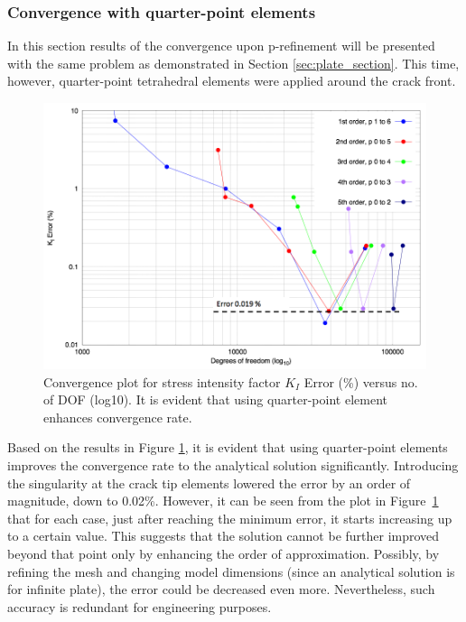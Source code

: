 \documentclass[11pt]{ACMEarticle}
\numberwithin{equation}{section}
\begin{document}
\subsubsection{Convergence with quarter-point elements}
In this section results of the convergence upon p-refinement will be presented with the same problem as demonstrated in Section \ref{sec:plate_section}. This time, however, quarter-point tetrahedral elements were applied around the crack front.
\begin{figure}[h!]
	\centering
	\includegraphics[width=0.7\linewidth]{Figures/graphs/plate_conv_singularity}
	\caption{Convergence plot for stress intensity factor $K_I$ Error (\%) versus no. of DOF (log10). It is evident that using quarter-point element enhances convergence rate.}
	\label{fig:plate_conv_singularity}
\end{figure}
Based on the results in Figure \ref{fig:plate_conv_singularity}, it is evident that using quarter-point elements improves the convergence rate to the analytical solution significantly. Introducing the singularity at the crack tip elements lowered the error by an order of magnitude, down to 0.02\%. However, it can be seen from the plot in Figure~\ref{fig:plate_conv_singularity} that for each case, just after reaching the minimum error, it starts increasing up to a certain value. This suggests that the solution cannot be further improved beyond that point only by enhancing the order of approximation. Possibly, by refining the mesh and changing model dimensions (since an analytical solution is for infinite plate), the error could be decreased even more. Nevertheless, such accuracy is redundant for engineering purposes. \\ %
\end{document}

